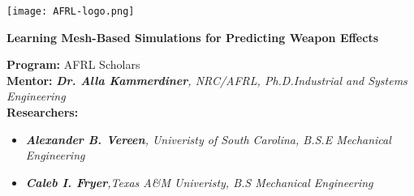 \begin{titlepage}
	\centering
	
	\texttt{[image: AFRL-logo.png]} %

	\vspace{2cm}
	
	\Huge{\textbf{Learning Mesh-Based Simulations for Predicting Weapon Effects}}
	
	
	\vspace{1cm}
	\begin{flushleft}
	
		\begin{large}
			\textbf{Program:} AFRL Scholars\\
			\vspace{1cm}
			\textbf{Mentor:} 
			\textit{\textbf{Dr. Alla Kammerdiner}, NRC/AFRL, Ph.D.Industrial and Systems Engineering}\\
			\vspace{1cm}
			\textbf{Researchers:}\\
			\begin{itemize}
				\item \textit{\textbf{Alexander B. Vereen}, Univeristy of South Carolina, B.S.E Mechanical Engineering} 
				\item \textit{\textbf{Caleb I. Fryer},Texas A\&M Univeristy, B.S Mechanical Engineering }
			\end{itemize}
		\end{large}

	\end{flushleft}
	
	\vfill
	
	\Large{\date{\today}}
	
\end{titlepage}